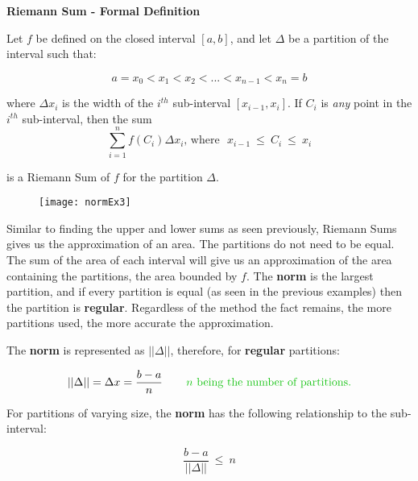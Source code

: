\documentclass[12pt]{article}
\begin{document}
\begin{tcolorbox}[colback = lightgray!75!white,
				  sharp corners = all,
				  colframe = lightgray!75!white]
\textbf{\large Riemann Sum - Formal Definition}

\bigskip

Let $f$ be defined on the closed interval $[a,b]$, and let $\Delta$ be a partition of the interval such that:

$$a = x_0 < x_1 < x_2 < ... < x_{n-1} < x_n = b$$

\bigskip
where $\Delta x_i$ is the width of the $i^{th}$ sub-interval $[x_{i-1}, x_i]$. If $C_i$ is \textit{any} point in the $i^{th}$ sub-interval, then the sum
\bigskip
$$ \sum_{i=1}^{n}f(C_i) \Delta x_i\text{, \  where} \  \ \  x_{i-1} \ \le  \ C_i \  \le \  x_i$$
\bigskip

is a Riemann Sum of $f$ for the partition $\Delta$.
 
\end{tcolorbox}

\begin{wrapfigure}{r}{.45\textwidth}
\texttt{[image: normEx3]}
\end{wrapfigure}

\bigskip

\bigskip

Similar to finding the upper and lower sums as seen previously, Riemann Sums gives us the approximation of an area. The partitions do not need to be equal. The sum of the area of each interval will give us an approximation of the area containing the partitions, the area bounded by $f$. The \textbf{norm} is the largest partition, and if every partition is equal (as seen in the previous examples) then the partition is \textbf{regular}. Regardless of the method the fact remains, the more partitions used, the more accurate the approximation.

\bigskip

\bigskip

The \textbf{norm} is represented as $||\Delta||$, therefore, for \textbf{regular} partitions:

$$ ||\Delta|| = \Delta x = \frac{b-a}{n} \ \color{myblue} \hspace{.5cm} \ n \ \text{being the number of partitions.}$$

\noindent For partitions of varying size, the \textbf{norm} has the following relationship to the sub-interval:

$$ \frac{b-a}{||\Delta||} \ \le \ n $$
\end{document}
